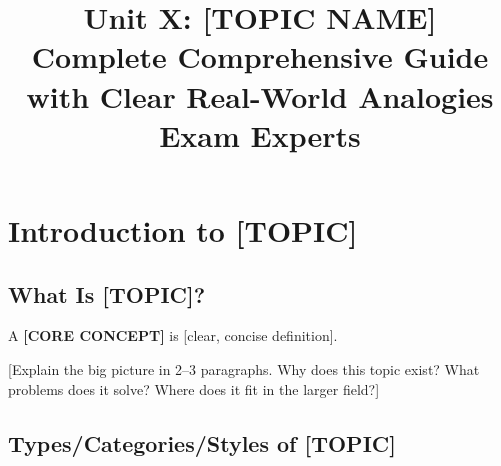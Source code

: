 \documentclass[12pt,letterpaper]{article}
\title{
  \textbf{Unit X: [TOPIC NAME]}\\[4pt]
  \Large Complete Comprehensive Guide with Clear Real-World Analogies\\[4pt]
  \large Exam Experts
}
\date{}
\begin{document}
\maketitle
\tableofcontents
\newpage


\section{Introduction to [TOPIC]}

\subsection{What Is [TOPIC]?}

\begin{definition}
A \textbf{[CORE CONCEPT]} is [clear, concise definition].
\end{definition}

[Explain the big picture in 2--3 paragraphs. Why does this topic exist?
What problems does it solve? Where does it fit in the larger field?]

\begin{analogy}
\end{analogy}


\subsection{Types/Categories/Styles of [TOPIC]}
\end{document}
